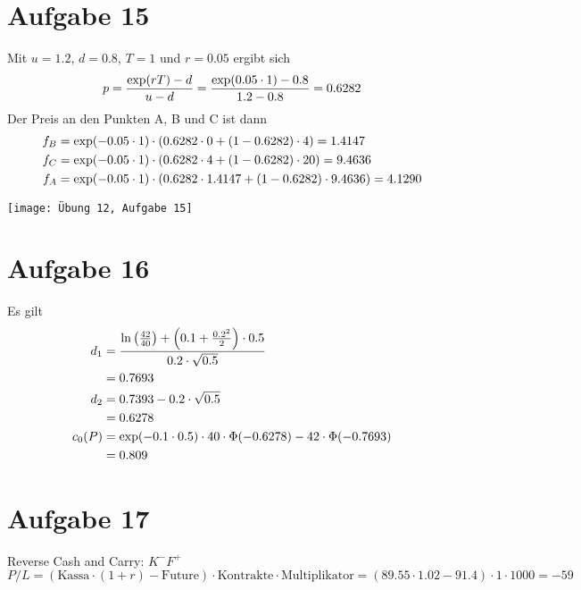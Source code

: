 \documentclass{article}
\begin{document}
	\section*{Aufgabe 15}
	Mit $u=1.2$, $d=0.8$, $T=1$ und $r=0.05$ ergibt sich
	\begin{align}
		p = \frac{\exp(rT) - d}{u-d} = \frac{\exp(0.05\cdot 1) - 0.8}{1.2-0.8} = 0.6282 \notag
	\end{align}
	Der Preis an den Punkten A, B und C ist dann
	\begin{align}
		f_B &= \exp(-0.05\cdot 1)\cdot (0.6282\cdot 0 + (1-0.6282)\cdot 4) = 1.4147 \notag \\
		f_C &= \exp(-0.05\cdot 1)\cdot (0.6282\cdot 4 + (1-0.6282)\cdot 20) = 9.4636 \notag \\
		f_A &= \exp(-0.05\cdot 1)\cdot (0.6282\cdot 1.4147 + (1-0.6282)\cdot 9.4636) = 4.1290 \notag
	\end{align}
	\begin{center}
		\texttt{[image: Übung 12, Aufgabe 15]}
	\end{center}
	
	\section*{Aufgabe 16}
	Es gilt
	\begin{align}
		d_1 &= \frac{\ln\left(\frac{42}{40}\right) + \left(0.1+\frac{0.2^2}{2}\right)\cdot 0.5}{0.2\cdot\sqrt{0.5}} \notag \\
		&= 0.7693 \notag \\
		d_2 &= 0.7393 - 0.2\cdot\sqrt{0.5} \notag \\
		&= 0.6278 \notag \\
		c_0(P) &= \exp(-0.1\cdot 0.5)\cdot 40\cdot\Phi(-0.6278) - 42\cdot\Phi(-0.7693) \notag \\
		&= 0.809 \notag
	\end{align}
	
	\section*{Aufgabe 17}
	Reverse Cash and Carry: $K^-F^+$ \\
	$P/L = (\text{Kassa}\cdot (1+r) - \text{Future})\cdot \text{Kontrakte}\cdot \text{Multiplikator} = (89.55\cdot 1.02 - 91.4)\cdot 1\cdot 1000 = -59$
	
\end{document}
